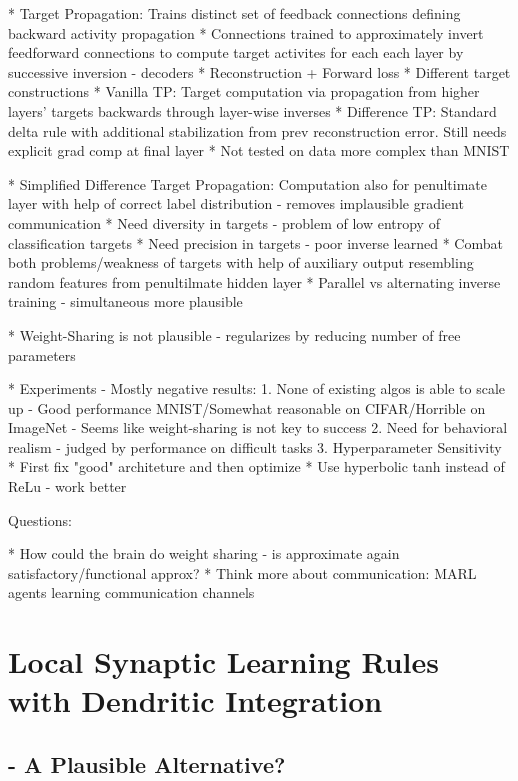 \documentclass[colorinlistoftodos]{article}
\theoremstyle{definition}
\begin{document}
* Target Propagation: Trains distinct set of feedback connections defining backward activity propagation
    * Connections trained to approximately invert feedforward connections to compute target activites for each each layer by successive inversion - decoders
        * Reconstruction + Forward loss
        * Different target constructions
    * Vanilla TP: Target computation via propagation from higher layers' targets backwards through layer-wise inverses
    * Difference TP: Standard delta rule with additional stabilization from prev reconstruction error. Still needs explicit grad comp at final layer
    * Not tested on data more complex than MNIST

* Simplified Difference Target Propagation: Computation also for penultimate layer with help of correct label distribution - removes implausible gradient communication
    * Need diversity in targets - problem of low entropy of classification targets
    * Need precision in targets - poor inverse learned
    * Combat both problems/weakness of targets with help of auxiliary output resembling random features from penultilmate hidden layer
    * Parallel vs alternating inverse training - simultaneous more plausible

* Weight-Sharing is not plausible - regularizes by reducing number of free parameters

* Experiments - Mostly negative results:
    1. None of existing algos is able to scale up - Good performance MNIST/Somewhat reasonable on CIFAR/Horrible on ImageNet - Seems like weight-sharing is not key to success
    2. Need for behavioral realism - judged by performance on difficult tasks
    3. Hyperparameter Sensitivity
        * First fix "good" architeture and then optimize
        * Use hyperbolic tanh instead of ReLu - work better


Questions:

* How could the brain do weight sharing - is approximate again satisfactory/functional approx?
* Think more about communication: MARL agents learning communication channels

\newpage
\section{Local Synaptic Learning Rules with Dendritic Integration}

\subsection*{\citet{guerguiev2017} - A Plausible Alternative?}
\end{document}
